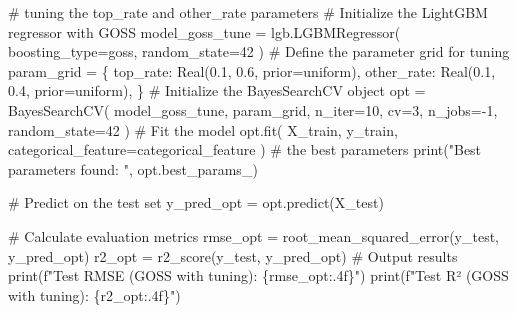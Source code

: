 \documentclass[
  letterpaper,
  DIV=11,
  numbers=noendperiod]{scrreprt}
\newenvironment{Shaded}{\begin{snugshade}}{\end{snugshade}}
\newcommand{\BuiltInTok}[1]{\textcolor[rgb]{0.00,0.23,0.31}{#1}}
\newcommand{\CommentTok}[1]{\textcolor[rgb]{0.37,0.37,0.37}{#1}}
\newcommand{\DecValTok}[1]{\textcolor[rgb]{0.68,0.00,0.00}{#1}}
\newcommand{\FloatTok}[1]{\textcolor[rgb]{0.68,0.00,0.00}{#1}}
\newcommand{\NormalTok}[1]{\textcolor[rgb]{0.00,0.23,0.31}{#1}}
\newcommand{\OperatorTok}[1]{\textcolor[rgb]{0.37,0.37,0.37}{#1}}
\newcommand{\SpecialCharTok}[1]{\textcolor[rgb]{0.37,0.37,0.37}{#1}}
\newcommand{\SpecialStringTok}[1]{\textcolor[rgb]{0.13,0.47,0.30}{#1}}
\newcommand{\StringTok}[1]{\textcolor[rgb]{0.13,0.47,0.30}{#1}}
\begin{document}
\begin{Shaded}
\begin{Highlighting}[]
\CommentTok{\# tuning the top\_rate and other\_rate parameters}
\CommentTok{\# Initialize the LightGBM regressor with GOSS}
\NormalTok{model\_goss\_tune }\OperatorTok{=}\NormalTok{ lgb.LGBMRegressor(}
\NormalTok{    boosting\_type}\OperatorTok{=}\StringTok{\textquotesingle{}goss\textquotesingle{}}\NormalTok{,}
\NormalTok{    random\_state}\OperatorTok{=}\DecValTok{42}
\NormalTok{)}
\CommentTok{\# Define the parameter grid for tuning}
\NormalTok{param\_grid }\OperatorTok{=}\NormalTok{ \{}
    \StringTok{\textquotesingle{}top\_rate\textquotesingle{}}\NormalTok{: Real(}\FloatTok{0.1}\NormalTok{, }\FloatTok{0.6}\NormalTok{, prior}\OperatorTok{=}\StringTok{\textquotesingle{}uniform\textquotesingle{}}\NormalTok{),}
    \StringTok{\textquotesingle{}other\_rate\textquotesingle{}}\NormalTok{: Real(}\FloatTok{0.1}\NormalTok{, }\FloatTok{0.4}\NormalTok{, prior}\OperatorTok{=}\StringTok{\textquotesingle{}uniform\textquotesingle{}}\NormalTok{),}
\NormalTok{\}}
\CommentTok{\# Initialize the BayesSearchCV object}
\NormalTok{opt }\OperatorTok{=}\NormalTok{ BayesSearchCV(}
\NormalTok{    model\_goss\_tune,}
\NormalTok{    param\_grid,}
\NormalTok{    n\_iter}\OperatorTok{=}\DecValTok{10}\NormalTok{,}
\NormalTok{    cv}\OperatorTok{=}\DecValTok{3}\NormalTok{,}
\NormalTok{    n\_jobs}\OperatorTok{={-}}\DecValTok{1}\NormalTok{,}
\NormalTok{    random\_state}\OperatorTok{=}\DecValTok{42}
\NormalTok{)}
\CommentTok{\# Fit the model}
\NormalTok{opt.fit(}
\NormalTok{    X\_train,}
\NormalTok{    y\_train,}
\NormalTok{    categorical\_feature}\OperatorTok{=}\NormalTok{categorical\_feature}
\NormalTok{)}
\CommentTok{\# the best parameters}
\BuiltInTok{print}\NormalTok{(}\StringTok{"Best parameters found: "}\NormalTok{, opt.best\_params\_)}

\CommentTok{\# Predict on the test set}
\NormalTok{y\_pred\_opt }\OperatorTok{=}\NormalTok{ opt.predict(X\_test)}

\CommentTok{\# Calculate evaluation metrics}
\NormalTok{rmse\_opt }\OperatorTok{=}\NormalTok{ root\_mean\_squared\_error(y\_test, y\_pred\_opt)}
\NormalTok{r2\_opt }\OperatorTok{=}\NormalTok{ r2\_score(y\_test, y\_pred\_opt)}
\CommentTok{\# Output results}
\BuiltInTok{print}\NormalTok{(}\SpecialStringTok{f"Test RMSE (GOSS with tuning): }\SpecialCharTok{\{}\NormalTok{rmse\_opt}\SpecialCharTok{:.4f\}}\SpecialStringTok{"}\NormalTok{)}
\BuiltInTok{print}\NormalTok{(}\SpecialStringTok{f"Test R² (GOSS with tuning): }\SpecialCharTok{\{}\NormalTok{r2\_opt}\SpecialCharTok{:.4f\}}\SpecialStringTok{"}\NormalTok{)}
\end{Highlighting}
\end{Shaded}
\end{document}
